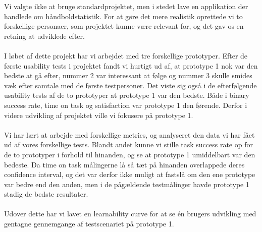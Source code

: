 Vi valgte ikke at bruge standardprojektet, men i stedet lave en applikation der handlede om håndboldstatistik. For at gøre det mere realistik oprettede vi to forskellige personaer, som projektet kunne være relevant for, og det gav os en retning at udviklede efter.\\\\I løbet af dette projekt har vi arbejdet med tre forskellige prototyper. Efter de første usability tests i projektet fandt vi hurtigt ud af, at prototype 1 nok var den bedste at gå efter, nummer 2 var interessant at følge og nummer 3 skulle smides væk efter samtale med de første testpersoner. Det viste sig også i de efterfølgende usability tests af de to prototyper at prototype 1 var den bedste. Både i binary success rate, time on task og satisfaction var prototype 1 den førende. Derfor i videre udvikling af projektet ville vi fokusere på prototype 1.\\\\Vi har lært at arbejde med forskellige metrics, og analyseret den data vi har fået ud af vores forskellige tests. Blandt andet kunne vi stille task success rate op for de to prototyper i forhold til hinanden, og se at prototype 1 umiddelbart var den bedeste. Da time on task målingerne lå så tæt på hinanden overlappede deres confidence interval, og det var derfor ikke muligt at fastslå om den ene prototype var bedre end den anden, men i de pågældende testmålinger havde prototype 1 stadig de bedste resultater.\\\\Udover dette har vi lavet en learnability curve for at se én brugers udvikling med gentagne gennemgange af testscenariet på prototype 1. 